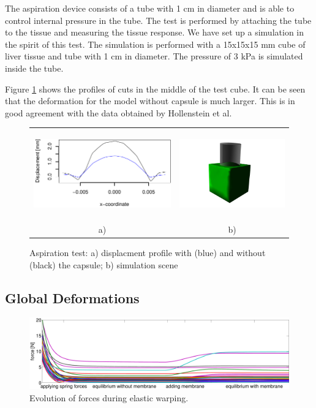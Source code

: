 \documentclass{llncs}
\begin{document}
The aspiration device consists of a tube with 1 cm in diameter and is able
to control internal pressure in the tube. The test is performed by
attaching the tube to the tissue and measuring the tissue response. We
have set up a simulation in the spirit of this test. 
The simulation is performed with a 15x15x15 mm cube of liver tissue and tube
with 1 cm in diameter. The pressure of 3 kPa is simulated inside the tube.

Figure \ref{fig-aspiration} shows the profiles of cuts in the middle of the
test cube. It can be seen that the
deformation for the model without capsule is much larger. This is in good
agreement with the data obtained by Hollenstein et al.

\begin{figure}[htb]
  \centering
  \begin{tabular}{cc}
    \includegraphics[width=3in]{aspiration.pdf} &
    \includegraphics[height=1.5in]{aspiration.jpg}\\
    a) & b)
  \end{tabular}

  \caption{\label{fig-aspiration}Aspiration test: a) displacment profile
  with (blue) and without (black) the capsule; b) simulation scene}
\end{figure}






\subsection{Global Deformations}

\begin{figure}[htb]
  \centering
    \includegraphics[width=.95\textwidth]{forceEvolution.pdf}
  \caption{\label{fig-force}Evolution of forces during elastic warping.}
\end{figure}
\end{document}
